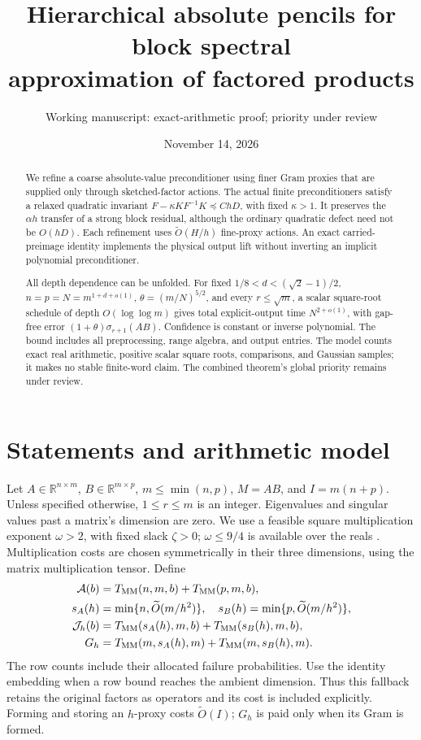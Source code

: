\documentclass[11pt]{article}
\title{Hierarchical absolute pencils for block spectral\\
approximation of factored products}
\author{Working manuscript: exact-arithmetic proof; priority under review}
\date{November 14, 2026}
\newcommand{\R}{\mathbb R}
\newcommand{\tO}{\widetilde O}
\newcommand{\MM}{T_{\rm MM}}
\newcommand{\Ac}{\mathcal A}
\newcommand{\Jc}{\mathcal J}
\begin{document}
\maketitle
\begin{abstract}
We refine a coarse absolute-value preconditioner using finer Gram
proxies that are supplied only through sketched-factor actions.
The actual finite preconditioners satisfy a relaxed quadratic invariant
\(F-\kappa KF^{-1}K\preceq ChD\), with fixed \(\kappa>1\).
It preserves the \(\alpha h\) transfer of a strong block residual,
although the ordinary quadratic defect need not be \(O(hD)\).
Each refinement uses \(\widetilde O(H/h)\) fine-proxy actions.
An exact carried-preimage identity implements the physical output lift
without inverting an implicit polynomial preconditioner.

All depth dependence can be unfolded. For fixed
\(1/8<d<(\sqrt2-1)/2\), \(n=p=N=m^{1+d+o(1)}\),
\(\theta=(m/N)^{5/2}\), and every \(r\leq\sqrt m\), a scalar
square-root schedule of depth \(O(\log\log m)\) gives total
explicit-output time \(N^{2+o(1)}\), with gap-free error
\((1+\theta)\sigma_{r+1}(AB)\). Confidence is constant or inverse
polynomial. The bound includes all preprocessing, range algebra,
and output entries. The model counts exact real arithmetic, positive
scalar square roots, comparisons, and Gaussian samples; it makes no
stable finite-word claim. The combined theorem's global priority remains
under review.
\end{abstract}

\section{Statements and arithmetic model}
Let \(A\in\R^{n\times m}\), \(B\in\R^{m\times p}\),
\(m\leq\min(n,p)\), \(M=AB\), and \(I=m(n+p)\).
Unless specified otherwise, \(1\leq r\leq m\) is an integer.
Eigenvalues and singular values past a matrix's dimension are zero.
We use a feasible square multiplication exponent \(\omega>2\), with
fixed slack \(\zeta>0\); \(\omega\leq9/4\) is available over the
reals \cite{amanov}. Multiplication costs are chosen symmetrically in
their three dimensions, using the matrix multiplication tensor. Define
\begin{align*}
 \Ac(b)&=\MM(n,m,b)+\MM(p,m,b),\\
 s_A(h)&=\min\{n,\tO(m/h^2)\},\quad
 s_B(h)=\min\{p,\tO(m/h^2)\},\\
 \Jc_h(b)&=\MM(s_A(h),m,b)+\MM(s_B(h),m,b),\\
 G_h&=\MM(m,s_A(h),m)+\MM(m,s_B(h),m).
\end{align*}
The row counts include their allocated failure probabilities. Use the
identity embedding when a row bound reaches the ambient dimension.
Thus this fallback retains the original factors as operators and its
cost is included explicitly. Forming and storing an \(h\)-proxy costs
\(\tO(I)\); \(G_h\) is paid only when its Gram is formed.
\end{document}

